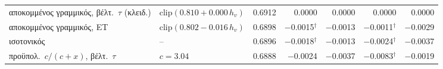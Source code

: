\begin{table}[t]
\begin{tabular}{@{}llrrrrr@{}}
αποκομμένος γραμμικός, βέλτ.\ $\tau$ (κλειδ.) & $\mathrm{clip}(0.810+0.000\,h_v)$ & 0.6912 & 0.0000 & 0.0000 & 0.0000 & 0.0000 \\
αποκομμένος γραμμικός, ΕΤ & $\mathrm{clip}(0.802-0.016\,h_v)$ & 0.6898 & $-$0.0015$^{\dagger}$ & $-$0.0013 & $-$0.0011$^{\dagger}$ & $-$0.0029 \\
ισοτονικός & -- & 0.6896 & $-$0.0018$^{\dagger}$ & $-$0.0013 & $-$0.0024$^{\dagger}$ & $-$0.0037 \\
προϋπολ.\ $c/(c+x)$, βέλτ.\ $\tau$ & $c=3.04$ & 0.6888 & $-$0.0024 & $-$0.0037 & $-$0.0083$^{\dagger}$ & $-$0.0019 \\
\bottomrule
\end{tabular}
\end{table}
